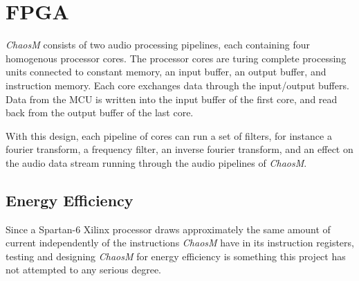 \FloatBarrier
\section{FPGA}\label{chapter:fpga}

\textit{ChaosM} consists of two audio processing pipelines, each containing four
homogenous processor cores. The processor cores are turing complete processing
units connected to constant memory, an input buffer, an output buffer, and
instruction memory. Each core exchanges data through the input/output buffers.
Data from the MCU is written into the input buffer of the first core, and read
back from the output buffer of the last core.

With this design, each pipeline of cores can run a set of filters, for instance
a fourier transform, a frequency filter, an inverse fourier transform, and an
effect on the audio data stream running through the audio pipelines of \textit{ChaosM}.








\subsection{Energy Efficiency}
Since a Spartan-6 Xilinx processor draws approximately the same amount of current
independently of the instructions \textit{ChaosM} have in its instruction registers,
testing and designing \textit{ChaosM} for energy efficiency is something this project
has not attempted to any serious degree.
